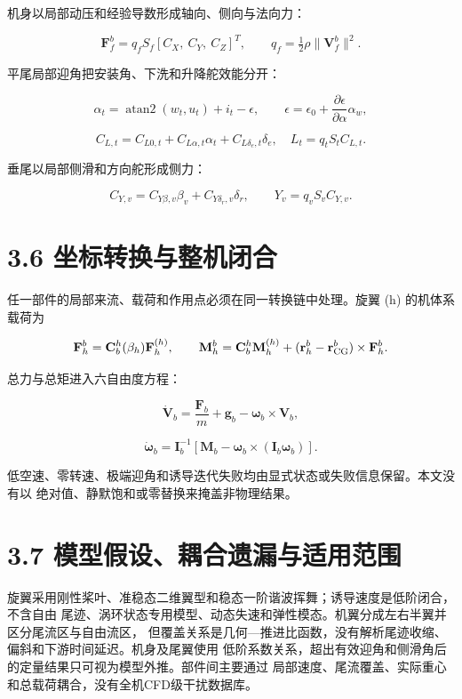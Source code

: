 \documentclass[UTF8,11pt,oneside,openany,fontset=windows]{ctexbook}
\begin{document}
机身以局部动压和经验导数形成轴向、侧向与法向力：

\[
\mathbf F_f^b=q_fS_f[C_X,\ C_Y,\ C_Z]^T,\qquad
q_f=\tfrac12\rho\|\mathbf V_f^b\|^2 .
\]

平尾局部迎角把安装角、下洗和升降舵效能分开：

\[
\alpha_t=\operatorname{atan2}(w_t,u_t)+i_t-\epsilon,\qquad
\epsilon=\epsilon_0+\frac{\partial\epsilon}{\partial\alpha}\alpha_w,
\]

\[
C_{L,t}=C_{L0,t}+C_{L\alpha,t}\alpha_t+C_{L\delta_e,t}\delta_e,
\quad L_t=q_tS_tC_{L,t}.
\]

垂尾以局部侧滑和方向舵形成侧力：

\[
C_{Y,v}=C_{Y\beta,v}\beta_v+C_{Y\delta_r,v}\delta_r,\qquad
Y_v=q_vS_vC_{Y,v}.
\]

\section{3.6
坐标转换与整机闭合}\label{ux5750ux6807ux8f6cux6362ux4e0eux6574ux673aux95edux5408}

任一部件的局部来流、载荷和作用点必须在同一转换链中处理。旋翼 (h)
的机体系载荷为

\[
\mathbf F_h^b=\mathbf C_b^h(\beta_h)\mathbf F_h^{(h)},\qquad
\mathbf M_h^b=\mathbf C_b^h\mathbf M_h^{(h)}
+(\mathbf r_h^b-\mathbf r_{\rm CG}^b)\times\mathbf F_h^b.
\]

总力与总矩进入六自由度方程：

\[
\dot{\mathbf V}_b=\frac{\mathbf F_b}{m}+\mathbf g_b
-\boldsymbol\omega_b\times\mathbf V_b,
\]

\[
\dot{\boldsymbol\omega}_b=\mathbf I_b^{-1}
\left[\mathbf M_b-\boldsymbol\omega_b\times(\mathbf I_b\boldsymbol\omega_b)\right].
\]

低空速、零转速、极端迎角和诱导迭代失败均由显式状态或失败信息保留。本文没有以
绝对值、静默饱和或零替换来掩盖非物理结果。

\section{3.7
模型假设、耦合遗漏与适用范围}\label{ux6a21ux578bux5047ux8bbeux8026ux5408ux9057ux6f0fux4e0eux9002ux7528ux8303ux56f4}

旋翼采用刚性桨叶、准稳态二维翼型和稳态一阶谐波挥舞；诱导速度是低阶闭合，不含自由
尾迹、涡环状态专用模型、动态失速和弹性模态。机翼分成左右半翼并区分尾流区与自由流区，
但覆盖关系是几何---推进比函数，没有解析尾迹收缩、偏斜和下游时间延迟。机身及尾翼使用
低阶系数关系，超出有效迎角和侧滑角后的定量结果只可视为模型外推。部件间主要通过
局部速度、尾流覆盖、实际重心和总载荷耦合，没有全机CFD级干扰数据库。
\end{document}
